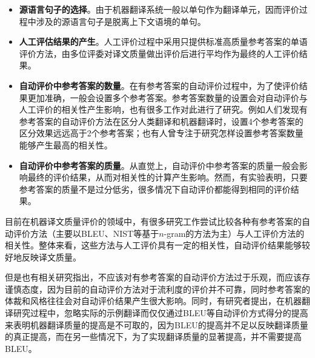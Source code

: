 \begin{itemize}
\vspace{0.5em}
\item {\small\sffamily\bfseries{源语言句子的选择}}。由于机器翻译系统一般以单句作为翻译单元，因而评价过程中涉及的源语言句子是脱离上下文语境的单句。
\vspace{0.5em}
\item {\small\sffamily\bfseries{人工评估结果的产生}}。人工评价过程中采用只提供标准高质量参考答案的单语评价方法，由多位评委对译文质量做出评价后进行平均作为最终的人工评价结果。
\vspace{0.5em}
\item {\small\sffamily\bfseries{自动评价中参考答案的数量}}。在有参考答案的自动评价过程中，为了使评价结果更加准确，一般会设置多个参考答案。参考答案数量的设置会对自动评价与人工评价的相关性产生影响，也有很多工作对此进行了研究。例如人们发现有参考答案的自动评价方法在区分人类翻译和机器翻译时，设置4个参考答案的区分效果远远高于2个参考答案；也有人曾专注于研究怎样设置参考答案数量能够产生最高的相关性。
\vspace{0.5em}
\item {\small\sffamily\bfseries{自动评价中参考答案的质量}}。从直觉上，自动评价中参考答案的质量一般会影响最终的评价结果，从而对相关性的计算产生影响。然而，有实验表明，只要参考答案的质量不是过分低劣，很多情况下自动评价都能得到相同的评价结果。
\vspace{0.5em}
\end{itemize}
\parinterval 目前在机器译文质量评价的领域中，有很多研究工作尝试比较各种有参考答案的自动评价方法（主要以BLEU、NIST等基于$n$-gram的方法为主）与人工评价方法的相关性。整体来看，这些方法与人工评价具有一定的相关性，自动评价结果能够较好地反映译文质量。

\parinterval 但是也有相关研究指出，不应该对有参考答案的自动评价方法过于乐观，而应该存谨慎态度，因为目前的自动评价方法对于流利度的评价并不可靠，同时参考答案的体裁和风格往往会对自动评价结果产生很大影响。同时，有研究者提出，在机器翻译研究过程中，忽略实际的示例翻译而仅仅通过BLEU等自动评价方式得分的提高来表明机器翻译质量的提高是不可取的，因为BLEU的提高并不足以反映翻译质量的真正提高，而在另一些情况下，为了实现翻译质量的显著提高，并不需要提高BLEU。


